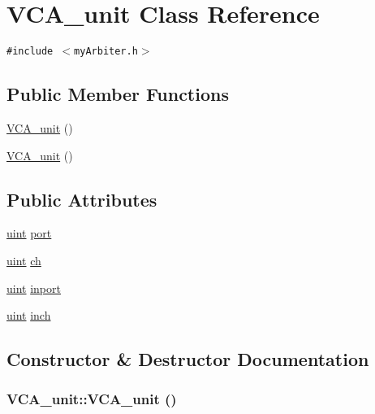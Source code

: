 \hypertarget{classVCA__unit}{
\section{VCA\_\-unit Class Reference}
\label{classVCA__unit}
}
{\tt \#include $<$myArbiter.h$>$}

\subsection*{Public Member Functions}
\begin{CompactItemize}
\item 
\hyperlink{classVCA__unit_0ecfa0ee48defa11d1b8fae9b35772d0}{VCA\_\-unit} ()
\item 
\hyperlink{classVCA__unit_0ecfa0ee48defa11d1b8fae9b35772d0}{VCA\_\-unit} ()
\end{CompactItemize}
\subsection*{Public Attributes}
\begin{CompactItemize}
\item 
\hyperlink{outputBuffer_8h_91ad9478d81a7aaf2593e8d9c3d06a14}{uint} \hyperlink{classVCA__unit_5f71811d7ddbb9228f66c5d616a20231}{port}
\item 
\hyperlink{outputBuffer_8h_91ad9478d81a7aaf2593e8d9c3d06a14}{uint} \hyperlink{classVCA__unit_4fa607fe21eb468c122cf2c8db2032a8}{ch}
\item 
\hyperlink{outputBuffer_8h_91ad9478d81a7aaf2593e8d9c3d06a14}{uint} \hyperlink{classVCA__unit_05367b0e16bb2a48c24f05b74d77193a}{inport}
\item 
\hyperlink{outputBuffer_8h_91ad9478d81a7aaf2593e8d9c3d06a14}{uint} \hyperlink{classVCA__unit_85870465ffa4fa56c2bc7fefdd018bf4}{inch}
\end{CompactItemize}


\subsection{Constructor \& Destructor Documentation}
\hypertarget{classVCA__unit_0ecfa0ee48defa11d1b8fae9b35772d0}{
\subsubsection[{VCA\_\-unit}]{\setlength{\rightskip}{0pt plus 5cm}VCA\_\-unit::VCA\_\-unit ()}}
\label{classVCA__unit_0ecfa0ee48defa11d1b8fae9b35772d0}


